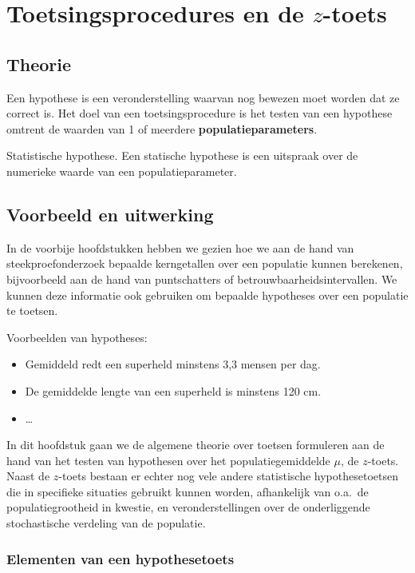 \chapter{Toetsingsprocedures en de \texorpdfstring{$z$}{z}-toets}

\section{Theorie}
Een hypothese is een veronderstelling waarvan nog bewezen moet worden dat ze correct is. Het doel van een toetsingsprocedure is het testen van een hypothese omtrent de waarden van 1 of meerdere \textbf{populatieparameters}.

\begin{definition}{Statistische hypothese.}
  Een statische hypothese is een uitspraak over de numerieke waarde van een populatieparameter.
\end{definition}


\section{Voorbeeld en uitwerking}

In de voorbije hoofdstukken hebben we gezien hoe we aan de hand van steekproefonderzoek bepaalde kerngetallen over een populatie kunnen berekenen, bijvoorbeeld aan de hand van puntschatters of betrouwbaarheidsintervallen. We kunnen deze informatie ook gebruiken om bepaalde hypotheses over een populatie te toetsen.

Voorbeelden van hypotheses:

\begin{itemize}
  \item Gemiddeld redt een superheld minstens 3,3 mensen per dag.
  \item De gemiddelde lengte van een superheld is minstens 120 cm.
  \item \dots
\end{itemize}

In dit hoofdstuk gaan we de algemene theorie over toetsen formuleren aan de hand van het testen van hypothesen over het populatiegemiddelde $\mu$, de $z$-toets. Naast de $z$-toets bestaan er echter nog vele andere statistische hypothesetoetsen die in specifieke situaties gebruikt kunnen worden, afhankelijk van o.a.~de populatiegrootheid in kwestie, en veronderstellingen over de onderliggende stochastische verdeling van de populatie.

\subsection{Elementen van een hypothesetoets}

